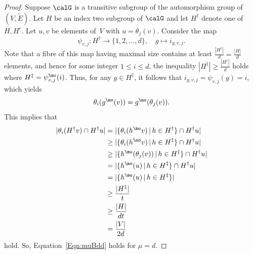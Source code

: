 \begin{proof}
Suppose $\calG$ is a transitive subgroup of the automorphism group of $(V, \widetilde E)$. Let $H$ be an index two subgroup of $\calG$ and let $H^\dag$ denote one of $H, H^c$. Let $u,v$ be elements of~$V$ with $u = \theta_j(v)$. Consider the map 
$$\psi_{v, j} : H^\dag \to \{1, 2, \ldots, d\},\quad
g \mapsto i_{g, v, j}.$$
Note that a fibre of this map having maximal size contains at least $\frac {|H^\dag|}d = \frac{|H|}d$ elements, and hence for some integer $1\leq i \leq d$, the inequality $|H^\ddag  |\geq \frac {|H^\dag|}d$ holds where $H^\ddag = \psi_{v, j}^\mo(i)$. Thus, for any $g\in H^\ddag$, it follows that $i_{g, v, j} = \psi_{v, j}(g) = i$, which yields 
\[\theta_i(g^\mo(v)) = g^\mo (\theta_j (v)) .\]
This implies that 
\begin{align*}
|\theta_{i} (H^\dag v) \cap H^\dag u|
& = |\{\theta_{i}(h^\mo v) \,|\, h\in H^\dag\}\cap H^\dag u|\\
& \geq |\{\theta_{i}(h^\mo v) \,|\, h\in H^\ddag\}\cap H^\dag u|\\
& \geq |\{h^\mo (\theta_j(v)) \,|\, h\in H^\ddag\}\cap H^\dag u|\\
& = |\{h^\mo (u) \,|\, h\in H^\ddag\}\cap H^\dag u|\\
& = |\{h^\mo (u) \,|\, h\in H^\ddag\}|\\
& \geq \frac{|H^\ddag|}{t} \\
& \geq \frac{|H|}{dt}\\
& = \frac{|V|}{2d}
\end{align*}
hold. So, Equation~\eqref{Eqn:muBdd} holds for $\mu = d$. 
\end{proof}
